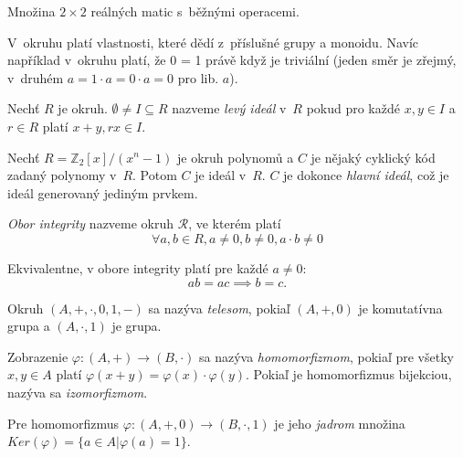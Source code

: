 \begin{example}
    Množina $2 \times 2$ reálných matic s~běžnými operacemi.
\end{example}

V~okruhu platí vlastnosti, které dědí z~příslušné grupy a monoidu.
Navíc například v~okruhu platí, že 0 = 1 právě když je triviální (jeden
směr je zřejmý, v~druhém $a = 1 \cdot a = 0 \cdot a = 0$ pro lib. $a$).

\begin{definition}
    Nechť $R$ je okruh.
    $\emptyset \neq I \subseteq R$ nazveme {\em levý ideál} v~$R$
    pokud pro každé $x,y \in I$ a $r \in R$ platí
    $x + y, rx \in I$.
\end{definition}

\begin{example}
    Nechť $R = \mathbb{Z}_2[x] / (x^n - 1)$ je okruh polynomů
    a $C$ je nějaký cyklický kód zadaný polynomy v~$R$.
    Potom $C$ je ideál v~$R$.
    $C$ je dokonce {\em hlavní ideál}, což je ideál generovaný jediným prvkem.
\end{example}

\begin{definition}
    {\em Obor integrity} nazveme okruh $\mathcal{R}$, ve kterém platí
    \[
        \forall a,b \in R, a \neq 0, b \neq 0, a \cdot b \neq 0
    \]
\end{definition}

Ekvivalentne, v obore integrity platí pre každé $a \neq 0$:
\[
	ab = ac \implies b = c.
\]

\begin{definition}[Teleso]
    Okruh $(A, +, \cdot, 0, 1, -)$ sa nazýva {\em telesom}, pokiaľ
	$(A, +, 0)$ je komutatívna grupa a $(A, \cdot, 1)$ je grupa.
\end{definition}

\begin{definition}
    Zobrazenie $\varphi: (A,+) \to (B,\cdot)$ sa nazýva {\em homomorfizmom},
	pokiaľ pre všetky $x,y \in A$ platí $\varphi(x+y)=\varphi(x) \cdot \varphi(y)$.
	Pokiaľ je homomorfizmus bijekciou, nazýva sa {\em izomorfizmom}.
\end{definition}

\begin{definition}
    Pre homomorfizmus $\varphi: (A,+,0) \to (B,\cdot,1)$ je jeho {\em jadrom}
	množina $Ker(\varphi)=\{ a \in A  | \varphi(a) = 1\}$.
\end{definition}

